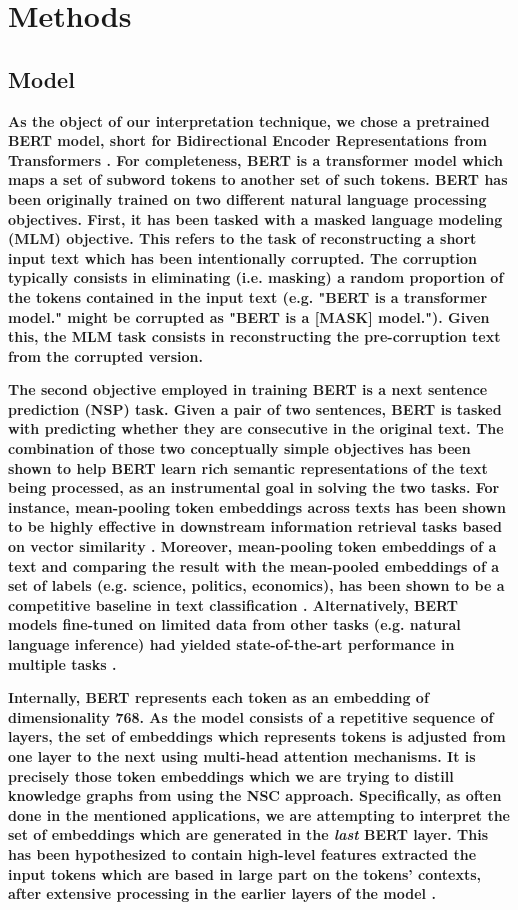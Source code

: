 \section{Methods}\label{sec:methods}

\subsection{Model}

\textbf{As the object of our interpretation technique, we chose a pretrained BERT model, short for Bidirectional Encoder Representations from Transformers \citep{devlin_bert_nodate}. For completeness, BERT is a transformer model which maps a set of subword tokens to another set of such tokens. BERT has been originally trained on two different natural language processing objectives. First, it has been tasked with a masked language modeling (MLM) objective. This refers to the task of reconstructing a short input text which has been intentionally corrupted. The corruption typically consists in eliminating (i.e. masking) a random proportion of the tokens contained in the input text (e.g. "BERT is a transformer model." might be corrupted as "BERT is a [MASK] model."). Given this, the MLM task consists in reconstructing the pre-corruption text from the corrupted version.}

\textbf{The second objective employed in training BERT is a next sentence prediction (NSP) task. Given a pair of two sentences, BERT is tasked with predicting whether they are consecutive in the original text. The combination of those two conceptually simple objectives has been shown to help BERT learn rich semantic representations of the text being processed, as an instrumental goal in solving the two tasks. For instance, mean-pooling token embeddings across texts has been shown to be highly effective in downstream information retrieval tasks based on vector similarity \citep{reimers_sentence-bert_2019}. Moreover, mean-pooling token embeddings of a text and comparing the result with the mean-pooled embeddings of a set of labels (e.g. science, politics, economics), has been shown to be a competitive baseline in text classification \citep{yin_benchmarking_2019}. Alternatively, BERT models fine-tuned on limited data from other tasks (e.g. natural language inference) had yielded state-of-the-art performance in multiple tasks \citep{jiang_evaluating_2019}.}

\textbf{Internally, BERT represents each token as an embedding of dimensionality 768. As the model consists of a repetitive sequence of layers, the set of embeddings which represents tokens is adjusted from one layer to the next using multi-head attention mechanisms. It is precisely those token embeddings which we are trying to distill knowledge graphs from using the NSC approach. Specifically, as often done in the mentioned applications, we are attempting to interpret the set of embeddings which are generated in the \textit{last} BERT layer. This has been hypothesized to contain high-level features extracted the input tokens which are based in large part on the tokens' contexts, after extensive processing in the earlier layers of the model \citep{tenney_bert_2019}.}

